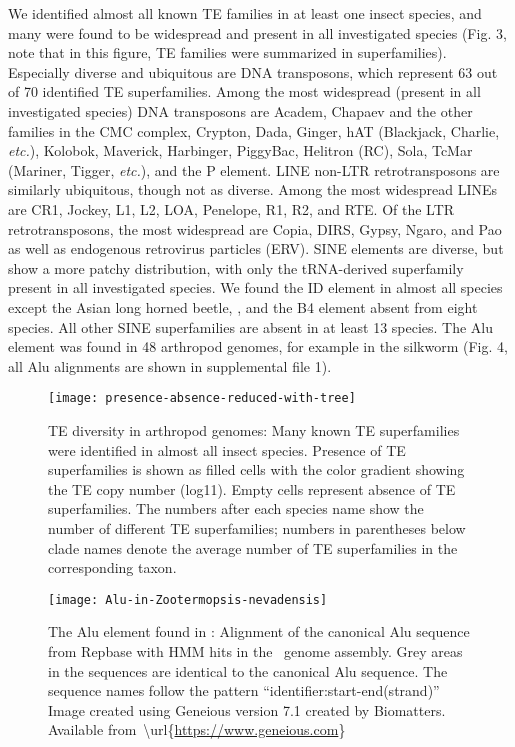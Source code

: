 We identified almost all known TE families in at least one insect
species, and many were found to be widespread and present in all
investigated species (Fig. 3, note that in this figure, TE families were
summarized in superfamilies). Especially diverse and ubiquitous are DNA
transposons, which represent 63 out of 70 identified TE superfamilies.
Among the most widespread (present in all investigated species) DNA
transposons are Academ, Chapaev and the other families in the CMC
complex, Crypton, Dada, Ginger, hAT (Blackjack, Charlie, \emph{etc.}),
Kolobok, Maverick, Harbinger, PiggyBac, Helitron (RC), Sola, TcMar
(Mariner, Tigger, \emph{etc.}), and the P element. LINE non-LTR
retrotransposons are similarly ubiquitous, though not as diverse. Among
the most widespread LINEs are CR1, Jockey, L1, L2, LOA, Penelope, R1,
R2, and RTE. Of the LTR retrotransposons, the most widespread are Copia,
DIRS, Gypsy, Ngaro, and Pao as well as endogenous retrovirus particles
(ERV). SINE elements are diverse, but show a more patchy distribution,
with only the tRNA-derived superfamily present in all investigated
species. We found the ID element in almost all species except the Asian
long horned beetle, , and the B4
element absent from eight species. All other SINE superfamilies are
absent in at least 13 species. The Alu element was found in 48 arthropod
genomes, for example in the silkworm  (Fig. 4, all
Alu alignments are shown in supplemental file 1).

\begin{figure}[h!]
\begin{center}
\texttt{[image: presence-absence-reduced-with-tree]}
\caption[TE diversity in arthropod genomes]{{TE diversity in arthropod genomes: Many known TE superfamilies were
identified in almost all insect species. Presence of TE superfamilies is
shown as filled cells with the color gradient showing the TE copy number
(log11). Empty cells represent absence of TE superfamilies. The numbers
after each species name show the number of different TE superfamilies;
numbers in parentheses below clade names denote the average number of TE
superfamilies in the corresponding taxon.%
}}
\end{center}
\end{figure}

\begin{figure}[h!]
\begin{center}
\texttt{[image: Alu-in-Zootermopsis-nevadensis]}
\caption[The Alu element found in ]{{The Alu element
found in : Alignment of the canonical Alu sequence
from Repbase with HMM hits in the~ genome assembly. Grey
areas in the sequences are identical to the canonical Alu sequence. The
sequence names follow the pattern ``identifier:start-end(strand)'' Image
created using Geneious version 7.1 created by Biomatters. Available
from~\textbackslash{}url\{\url{https://www.geneious.com}\}
{\label{169157}}%
}}
\end{center}
\end{figure}

